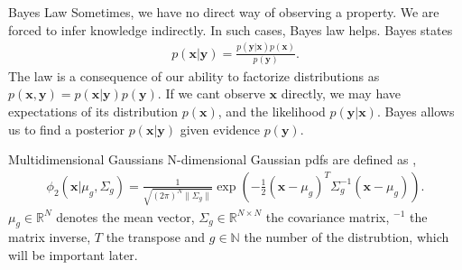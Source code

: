 \documentclass{beamer}
\begin{document}
    \begin{frame}{Bayes Law \cite{deisenroth2020mathematics}}
      Sometimes, we have no direct way of observing a property. We are forced to infer knowledge indirectly.
      In such cases, Bayes law helps. Bayes states
      \begin{align}
        p(\mathbf{x}|\mathbf{y}) = \frac{p(\mathbf{y}|\mathbf{x})p(\mathbf{x})}{p(\mathbf{y})}.
      \end{align}
      The law is a consequence of our ability to factorize distributions as $p(\mathbf{x},\mathbf{y})
      = p(\mathbf{x}|\mathbf{y})p(\mathbf{y})$.
      If we cant observe $\mathbf{x}$ directly, we may have expectations of its distribution $p(\mathbf{x})$,
      and the likelihood $p(\mathbf{y}|\mathbf{x})$. Bayes allows us to find a posterior $p(\mathbf{x}|\mathbf{y})$
      given evidence $p(\mathbf{y})$.

    \end{frame}

    \begin{frame}{Multidimensional Gaussians}
      N-dimensional Gaussian pdfs are defined as \cite{mcnicholas2016mixture},
      \begin{align}
      \phi_2(\mathbf{x} | \mu_g, \Sigma_g) = \frac{1}{\sqrt{(2\pi)^N \| \Sigma_g \|}} \exp({-\frac{1}{2}(\mathbf{x}-\mu_g)^T \Sigma_g^{-1}(\mathbf{x}-\mu_g)}).
      \end{align}
      $\mu_g \in \mathbb{R}^N$ denotes the mean vector, $\Sigma_g \in \mathbb{R}^{N\times N}$ the covariance matrix, $^{-1}$ the matrix inverse, $T$ the transpose and $g \in \mathbb{N}$ the number of the distrubtion, which will be important later. 
    \end{frame}
\end{document}
